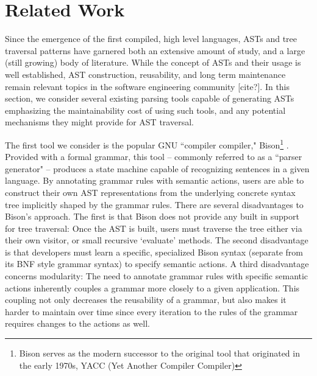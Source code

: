 \documentclass[times]{speauth}
\begin{document}
\vspace{-6pt}


\section{Related Work}
\vspace{-2pt}

Since the emergence of the first compiled, high level languages, ASTs and tree traversal patterns have garnered both an extensive amount of study, and a large (still growing) body of literature. While the concept of ASTs and their usage is well established, AST construction, reusability, and long term maintenance remain relevant topics in the software engineering community [cite?]. In this section, we consider several existing parsing tools capable of generating ASTs emphasizing the maintainability cost of using such tools, and any potential mechanisms they might provide for AST traversal.

The first tool we consider is the popular GNU ``compiler compiler," Bison\footnote{Bison serves as the modern successor to the original tool that originated in the early 1970s, YACC (Yet Another Compiler Compiler)} \cite{levine:1992}. Provided with a formal grammar, this tool -- commonly referred to as a ``parser generator" -- produces a state machine capable of recognizing sentences in a given language. By annotating grammar rules with semantic actions, users are able to construct their own AST representations from the underlying concrete syntax tree implicitly shaped by the grammar rules. There are several disadvantages to Bison's approach. The first is that Bison does not provide any built in support for tree traversal: Once the AST is built, users must traverse the tree either via their own visitor, or small recursive `evaluate' methods. The second disadvantage is that developers must learn a specific, specialized Bison syntax (separate from its BNF style grammar syntax) to specify semantic actions. A third disadvantage concerns modularity: The need to annotate grammar rules with specific semantic actions inherently couples a grammar more closely to a given application. This coupling not only decreases the reusability of a grammar, but also makes it harder to maintain over time since every iteration to the rules of the grammar requires changes to the actions as well.
\end{document}
